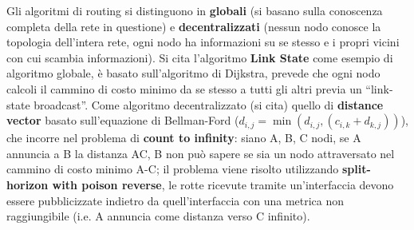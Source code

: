 \documentclass[11pt, italian, openany]{book}
\begin{document}
\begin{sloppypar}
Gli algoritmi di routing si distinguono in \textbf{globali} (si basano sulla conoscenza completa della rete in questione) e \textbf{decentralizzati} (nessun
nodo conosce la topologia dell'intera rete, ogni nodo ha informazioni su se stesso e i propri vicini con cui scambia informazioni).
Si cita l'algoritmo \textbf{Link State} come esempio di algoritmo globale, \`e basato sull'algoritmo di Dijkstra, prevede che ogni nodo calcoli il cammino
di costo minimo da se stesso a tutti gli altri previa un ``link-state broadcast''. Come algoritmo decentralizzato (si cita) quello di
\textbf{distance vector} basato sull'equazione di Bellman-Ford (\( d_{i,j} = \min(d_{i,j}, (c_{i,k} + d_{k,j})) \)), che incorre nel problema di
\textbf{count to infinity}: siano A, B, C nodi, se A annuncia a B la distanza AC, B non pu\`o sapere se sia un nodo attraversato nel cammino di costo
minimo A-C; il problema viene risolto utilizzando \textbf{split-horizon with poison reverse}, le rotte ricevute tramite un'interfaccia devono essere
pubblicizzate indietro da quell'interfaccia con una metrica non raggiungibile (i.e. A annuncia come distanza verso C infinito).


\end{sloppypar}
\end{document}
